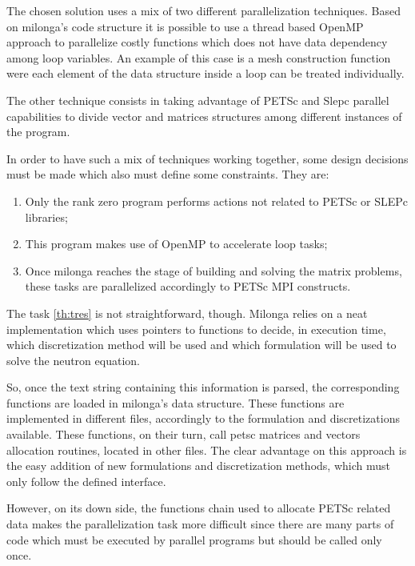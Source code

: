 \documentclass{anstrans}
\begin{document}
The chosen solution uses a mix of two different parallelization techniques. Based 
on milonga's code structure it is possible to use a thread based OpenMP approach to 
parallelize costly functions which does not have data dependency among loop variables. An example of this case is a mesh construction function were each element of the data structure inside a loop can be treated individually.

The other technique consists in taking advantage of PETSc and Slepc parallel 
capabilities to divide vector and matrices structures among different instances 
of the program.

In order to have such a mix of techniques working together, some design decisions 
must be made which also must define some constraints. They are:

\begin{enumerate}
\item Only the rank zero program performs actions not related to PETSc or SLEPc 
libraries;
\item This program makes use of OpenMP to accelerate loop tasks;
\item\label{th:tres} Once milonga reaches the stage of building and solving the matrix problems, these tasks are parallelized accordingly to PETSc MPI constructs.
\end{enumerate}

The task \ref{th:tres} is not straightforward, though. Milonga relies on a neat 
implementation which uses pointers to functions to decide, in execution time, 
which discretization method will be used and which formulation will be used to solve the neutron equation.

So, once the text string containing this information is parsed, the corresponding 
functions are loaded in milonga's data structure. These functions are implemented 
in different files, accordingly to the formulation and discretizations available. 
These functions, on their turn, call petsc matrices and vectors allocation 
routines, located in other files. The clear advantage on this approach is the 
easy addition of new formulations and discretization methods, which must only 
follow the defined interface.

However, on its down side, the functions chain used to allocate PETSc related 
data makes the parallelization task more difficult since there are many parts 
of code which must be executed by parallel programs but should be called only 
once.
\end{document}
